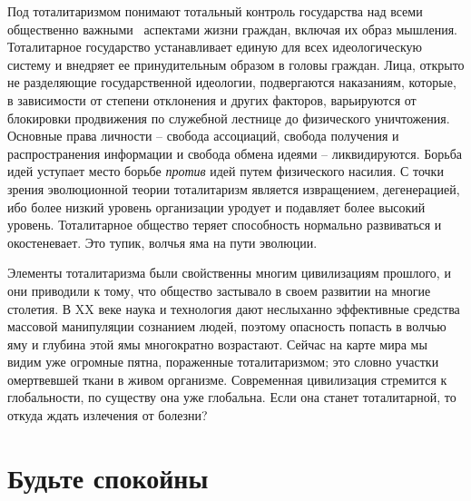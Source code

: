 \documentclass{book}
\begin{document}
Под тоталитаризмом понимают тотальный контроль государства над всеми общественно важными  аспектами жизни граждан, включая их образ мышления. Тоталитарное государ­ство устанавливает единую для всех идеологическую систему и внедряет ее принудительным образом в головы граждан. Лица, открыто не разделяющие государственной идеологии, подвергаются наказаниям, которые, в зависимости от степени отклонения и других факторов, варьируются от блокировки продвижения по служебной лестнице до физического уничтожения. Основные права личности -- свобода ассоциаций, свобода получения и распространения информации и свобода обмена идеями -- ликвидируются. Борьба идей уступает место борьбе \textit{против} идей путем физического насилия. С точки зрения эволюционной теории тоталитаризм является извращением, дегенерацией, ибо более низкий уровень организации уродует и подавляет более высокий уровень. Тоталитарное общество теряет способность нормально развиваться и око­стеневает. Это тупик, волчья яма на пути эволюции.

Элементы тоталитаризма были свойственны многим циви­лизациям прошлого, и они приводили к тому, что общество застывало в своем 
развитии на многие столетия. В XX веке наука и технология дают неслыханно эффективные средства массовой манипуляции сознанием 
людей, поэтому опасность попасть в волчью яму и глубина этой ямы многократно возрастают. Сейчас на карте мира мы видим уже 
огромные пятна, пораженные тоталитаризмом; это словно участки омертвевшей ткани в живом организме. Современная цивилизация 
стремится к глобальности, по существу она уже глобальна. Если она станет тоталитарной, то откуда ждать излечения от болезни?


\section{Будьте спокойны}
\end{document}
